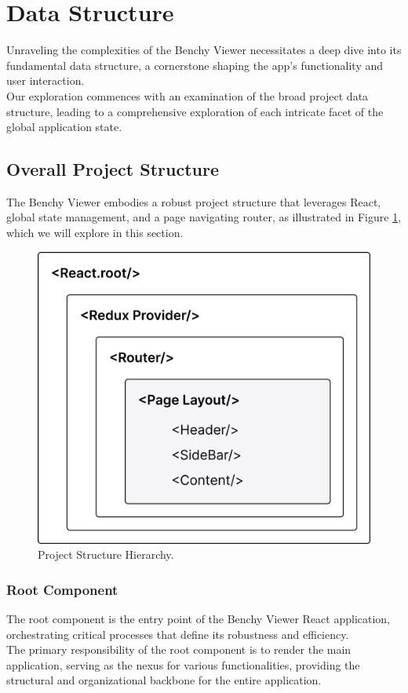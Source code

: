 \section{Data Structure}
Unraveling the complexities of the Benchy Viewer necessitates a deep dive into its fundamental data structure, a cornerstone shaping the app's functionality and user interaction.\\
Our exploration commences with an examination of the broad project data structure, leading to a comprehensive exploration of each intricate facet of the global application state.

\subsection{Overall Project Structure}

The Benchy Viewer embodies a robust project structure that leverages React, global state management, and a page navigating router, as illustrated in Figure \ref{fig:project-structure}, which we will explore in this section.

\begin{figure}[h]
  \vspace{0.5cm}
  \centering
  \includegraphics[width=0.5\linewidth]{figures/project-structure.png}
  \caption{Project Structure Hierarchy.}
  \label{fig:project-structure}
\end{figure}

\subsubsection{Root Component}
The root component is the entry point of the Benchy Viewer React application, orchestrating critical processes that define its robustness and efficiency.\\
The primary responsibility of the root component is to render the main application, serving as the nexus for various functionalities, providing the structural and organizational backbone for the entire application. 


